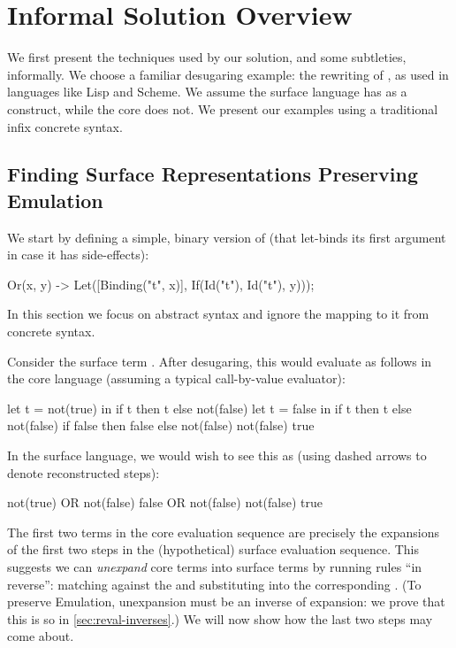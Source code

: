 \section{Informal Solution Overview}
\label{sec:reval-exposition}

We first present the techniques used by our solution, and some subtleties,
informally. We choose a familiar desugaring example: the rewriting
of , as used in languages like Lisp and Scheme. We assume
the surface language has  as a construct, while the core does
not. We present our examples using a traditional infix concrete syntax.

\subsection{Finding Surface Representations Preserving Emulation}

We start by defining a simple, binary version of  (that
let-binds its first argument in case it has side-effects):
\begin{Codes}
Or(x, y) -> Let([Binding("t", x)],
                If(Id("t"), Id("t"), y)));
\end{Codes}
In this section we focus on abstract syntax and ignore
the mapping to it from concrete syntax.

Consider the surface term . After
desugaring, this would evaluate as follows in the core language
(assuming a typical call-by-value evaluator):
\begin{Codes}
    let t = not(true) in
      if t then t else not(false)
\CoreStep let t = false in
      if t then t else not(false)
\CoreStep if false then false else not(false)
\CoreStep not(false)
\CoreStep true
\end{Codes}
In the surface language, we would wish to see this as (using dashed
arrows to denote reconstructed steps):
\begin{Codes}
    not(true) OR not(false)
\SurfStep false OR not(false)
\SurfStep not(false)
\SurfStep true
\end{Codes}
The first two terms in the core evaluation sequence are precisely the
expansions of the first two steps in the (hypothetical) surface evaluation
sequence. This suggests
we can \emph{unexpand} core terms into surface terms by running rules ``in
reverse'': matching against the  and substituting into the
corresponding .
(To preserve Emulation, unexpansion must be an inverse of expansion: we
prove that this is so in \cref{sec:reval-inverses}.)
We will now show how the last two steps
may come about.

